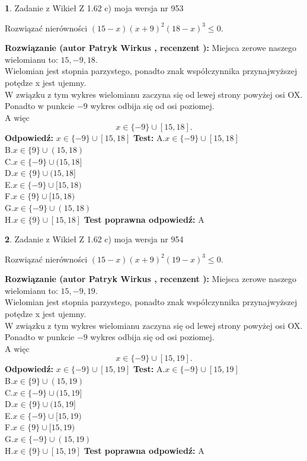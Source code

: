 \documentclass[12pt, a4paper]{article}
\theoremstyle{definition} %
\newtheorem{zad}{}
\newcommand{\zadStart}[1]{\begin{zad}#1\newline}
\newcommand{\zadStop}{\end{zad}}
\newcommand{\rozwStart}[2]{\noindent \textbf{Rozwiązanie (autor #1 , recenzent #2): }\newline}
\newcommand{\rozwStop}{\newline}
\newcommand{\odpStart}{\noindent \textbf{Odpowiedź:}\newline}
\newcommand{\odpStop}{\newline}
\newcommand{\testStart}{\noindent \textbf{Test:}\newline}
\newcommand{\testStop}{\newline}
\newcommand{\kluczStart}{\noindent \textbf{Test poprawna odpowiedź:}\newline}
\newcommand{\kluczStop}{\newline}
\begin{document}
\zadStart{Zadanie z Wikieł Z 1.62 c) moja wersja nr 953}

Rozwiązać nierówności $(15-x)(x+9)^{2}(18-x)^{3}\le0$.
\zadStop
\rozwStart{Patryk Wirkus}{}
Miejsca zerowe naszego wielomianu to: $15, -9, 18$.\\
Wielomian jest stopnia parzystego, ponadto znak współczynnika przy\linebreak najwyższej potędze x jest ujemny.\\ W związku z tym wykres wielomianu zaczyna się od lewej strony powyżej osi OX.\\
Ponadto w punkcie $-9$ wykres odbija się od osi poziomej.\\
A więc $$x \in \{-9\} \cup [15,18].$$
\rozwStop
\odpStart
$x \in \{-9\} \cup [15,18]$
\odpStop
\testStart
A.$x \in \{-9\} \cup [15,18]$\\
B.$x \in \{9\} \cup (15,18)$\\
C.$x \in \{-9\} \cup (15,18]$\\
D.$x \in \{9\} \cup (15,18]$\\
E.$x \in \{-9\} \cup [15,18)$\\
F.$x \in \{9\} \cup [15,18)$\\
G.$x \in \{-9\} \cup (15,18)$\\
H.$x \in \{9\} \cup [15,18]$
\testStop
\kluczStart
A
\kluczStop



\zadStart{Zadanie z Wikieł Z 1.62 c) moja wersja nr 954}

Rozwiązać nierówności $(15-x)(x+9)^{2}(19-x)^{3}\le0$.
\zadStop
\rozwStart{Patryk Wirkus}{}
Miejsca zerowe naszego wielomianu to: $15, -9, 19$.\\
Wielomian jest stopnia parzystego, ponadto znak współczynnika przy\linebreak najwyższej potędze x jest ujemny.\\ W związku z tym wykres wielomianu zaczyna się od lewej strony powyżej osi OX.\\
Ponadto w punkcie $-9$ wykres odbija się od osi poziomej.\\
A więc $$x \in \{-9\} \cup [15,19].$$
\rozwStop
\odpStart
$x \in \{-9\} \cup [15,19]$
\odpStop
\testStart
A.$x \in \{-9\} \cup [15,19]$\\
B.$x \in \{9\} \cup (15,19)$\\
C.$x \in \{-9\} \cup (15,19]$\\
D.$x \in \{9\} \cup (15,19]$\\
E.$x \in \{-9\} \cup [15,19)$\\
F.$x \in \{9\} \cup [15,19)$\\
G.$x \in \{-9\} \cup (15,19)$\\
H.$x \in \{9\} \cup [15,19]$
\testStop
\kluczStart
A
\kluczStop
\end{document}
